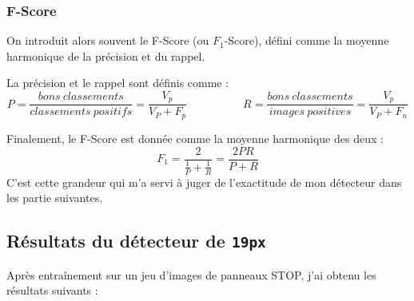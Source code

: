 \documentclass[12pt,a4paper]{article}
\begin{document}
\subsubsection{F-Score}
On introduit alors souvent le F-Score (ou $F_1$-Score), défini comme la moyenne harmonique de la précision et du rappel. \cite{powers}

La précision et le rappel sont définis comme :
\begin{equation}
    P = \frac{bons\ classements}{classements\ positifs} = \boxed{\frac{V_p}{V_P + F_p}}
    \hspace{5em}
    R = \frac{bons\ classements}{images\ positives} = \boxed{\frac{V_p}{V_P + F_n}}
\end{equation}

Finalement, le F-Score est donnée comme la moyenne harmonique des deux :
\begin{equation}
    \boxed{F_1 = \frac{2}{\frac{1}{P} + \frac{1}{R}} = \frac{2 P R}{P+R}}
\end{equation}
C'est cette grandeur qui m'a servi à juger de l'exactitude de mon détecteur dans les partie suivantes.

\subsection{Résultats du détecteur de \texttt{19px}}
Après entraînement sur un jeu d'images de panneaux STOP, j'ai obtenu les résultats suivants :
\renewcommand{\arraystretch}{1.3}
\begin{table}[h]
    
\end{table}
\end{document}
